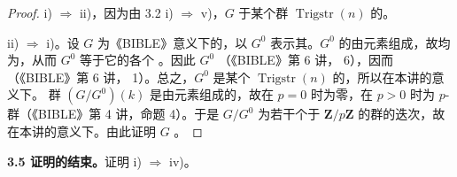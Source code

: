 \begin{proof}
i) $\Rightarrow$ ii)，因为由 3.2 i) $\Rightarrow$ v)，$G$ 于某个群 $\operatorname{Trigstr}(n)$ 的。

ii) $\Rightarrow$ i)。设 $G$ 为《BIBLE》意义下的，以 $G^0$ 表示其。$G^0$ 的由元素组成，故均为，从而 $G^0$ 等于它的各个 。因此 $G^0$ （《BIBLE》第 6 讲， 6），因而（《BIBLE》第 6 讲， 1）。总之，$G^0$ 是某个 $\operatorname{Trigstr}(n)$ 的，所以在本讲的意义下。
群 $(G/G^0)(k)$ 是由元素组成的，故在 $p=0$ 时为零，在 $p>0$ 时为 $p$-群（《BIBLE》第 4 讲，命题 4）。于是 $G/G^0$ 为若干个于 $\mathbf Z/p\mathbf Z$ 的群的迭次，故在本讲的意义下。由此证明 $G$ 。
\end{proof}
\textbf{3.5 证明的结束。}证明 i) $\Rightarrow$ iv)。

